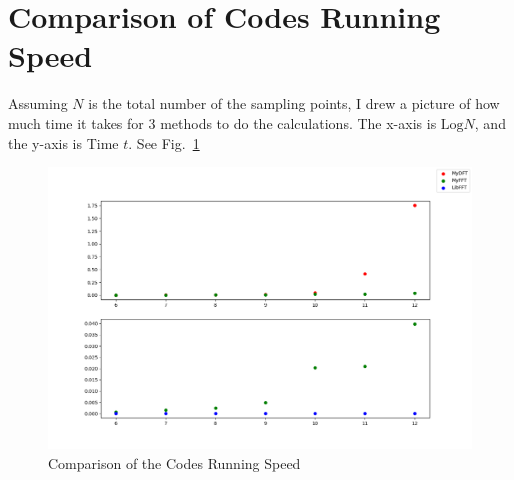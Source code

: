 \documentclass{article}
\begin{document}
\section{Comparison of Codes Running Speed}
Assuming $N$ is the total number of the sampling points, I drew a picture of how much time it takes for 3 methods to do the calculations. The x-axis is $\mathrm{Log}N$, and the y-axis is Time $t$. See Fig.~\ref{fig:speedtest}

\begin{figure}[!h]
    \centering
    \includegraphics[width=5 in]{../pic/speedtest.png}
    \caption{Comparison of the Codes Running Speed}
    \label{fig:speedtest}
\end{figure}

\newpage



\end{document}
